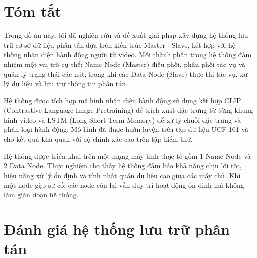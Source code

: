 \documentclass[../main.tex]{subfiles}
\begin{document}
\section{Tóm tắt}

Trong đồ án này, tôi đã nghiên cứu và đề xuất giải pháp xây dựng hệ thống lưu trữ cơ sở dữ liệu phân tán dựa trên kiến trúc Master - Slave, kết hợp với hệ thống nhận diện hành động người từ video. Mỗi thành phần trong hệ thống đảm nhiệm một vai trò cụ thể: Name Node (Master) điều phối, phân phối tác vụ và quản lý trạng thái các nút; trong khi các Data Node (Slave) thực thi tác vụ, xử lý dữ liệu và lưu trữ thông tin phân tán.

Hệ thống được tích hợp mô hình nhận diện hành động sử dụng kết hợp CLIP (Contrastive Language-Image Pretraining) để trích xuất đặc trưng từ từng khung hình video và LSTM (Long Short-Term Memory) để xử lý chuỗi đặc trưng và phân loại hành động. Mô hình đã được huấn luyện trên tập dữ liệu UCF-101 và cho kết quả khả quan với độ chính xác cao trên tập kiểm thử.

Hệ thống được triển khai trên một mạng máy tính thực tế gồm 1 Name Node và 2 Data Node. Thực nghiệm cho thấy hệ thống đảm bảo khả năng chịu lỗi tốt, hiệu năng xử lý ổn định và tính nhất quán dữ liệu cao giữa các máy chủ. Khi một node gặp sự cố, các node còn lại vẫn duy trì hoạt động ổn định mà không làm gián đoạn hệ thống.

\section{Đánh giá hệ thống lưu trữ phân tán}
\end{document}
